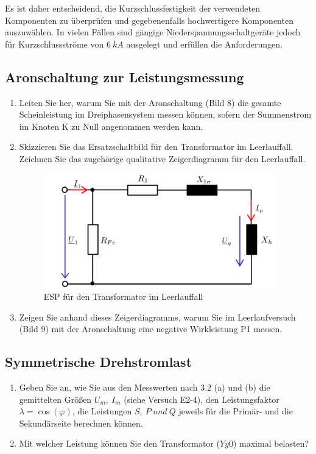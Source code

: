 \begin{enumerate}[label=\alph*)]
  Es ist daher entscheidend, die Kurzschlussfestigkeit der verwendeten Komponenten zu überprüfen und gegebenenfalls hochwertigere Komponenten auszuwählen. In vielen Fällen sind gängige Niederspannungsschaltgeräte jedoch für Kurzschlussströme von $6\ kA$ ausgelegt und erfüllen die Anforderungen.
  
\end{enumerate}
\subsection{Aronschaltung zur Leistungsmessung }
\begin{enumerate}[label=\alph*)]
  \item Leiten Sie her, warum Sie mit der Aronschaltung (Bild 8) die gesamte Scheinleistung im Dreiphasensystem messen können, sofern der Summenstrom im Knoten K zu Null angenommen werden kann.  
  \item Skizzieren Sie das Ersatzschaltbild für den Transformator im Leerlauffall. Zeichnen Sie das zugehörige qualitative Zeigerdiagramm für den Leerlauffall.
    \begin{figure}[h!]
      \begin{center}
        \includegraphics[width=0.95\textwidth]{img/2.2.2.1}
      \end{center}
      \caption{ESP für den Transformator im Leerlauffall}\label{img:2.2.2.1}
    \end{figure}
    
  \item Zeigen Sie anhand dieses Zeigerdiagramms, warum Sie im Leerlaufversuch (Bild 9) mit der Aronschaltung eine negative Wirkleistung P1 messen. 
\end{enumerate}
\subsection{Symmetrische Drehstromlast }
\begin{enumerate}[label=\alph*)]
  \item Geben Sie an, wie Sie aus den Messwerten nach 3.2 (a) und (b) die gemittelten Größen $U_m,\ I_m$ (siehe Versuch E2-4), den Leistungsfaktor $\lambda=\cos(\varphi)$, die Leistungen $S,\ P\ und\ Q$ jeweils für die Primär- und die Sekundärseite berechnen können. 
  \item Mit welcher Leistung können Sie den Transformator ($Yy0$) maximal belasten?
\end{enumerate}
